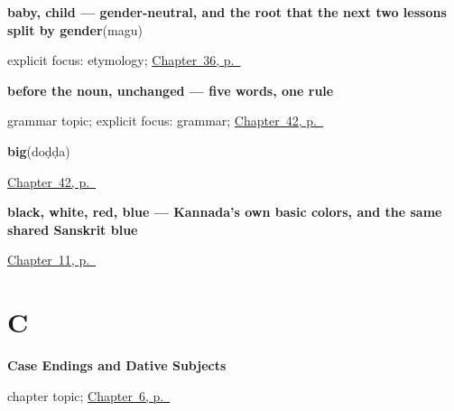 \noindent\begin{minipage}[t]{\linewidth}
\raggedright
\textbf{baby, child — gender-neutral, and the root that the next two lessons split by gender}\enspace\emph{}\enspace(magu)\par
\footnotesize explicit focus: etymology; \hyperref[ch:ka-child-son-daughter]{Chapter~36, p.~\pageref*{ch:ka-child-son-daughter}}
\end{minipage}\par\smallskip

\noindent\begin{minipage}[t]{\linewidth}
\raggedright
\textbf{before the noun, unchanged — five words, one rule}\par
\footnotesize grammar topic; explicit focus: grammar; \hyperref[ch:kn-describing-things]{Chapter~42, p.~\pageref*{ch:kn-describing-things}}
\end{minipage}\par\smallskip

\noindent\begin{minipage}[t]{\linewidth}
\raggedright
\textbf{big}\enspace\emph{}\enspace(doḍḍa)\par
\footnotesize \hyperref[ch:kn-describing-things]{Chapter~42, p.~\pageref*{ch:kn-describing-things}}
\end{minipage}\par\smallskip

\noindent\begin{minipage}[t]{\linewidth}
\raggedright
\textbf{black, white, red, blue — Kannada's own basic colors, and the same shared Sanskrit blue}\enspace\emph{   }\par
\footnotesize \hyperref[ch:ka-core-colours]{Chapter~11, p.~\pageref*{ch:ka-core-colours}}
\end{minipage}\par\smallskip

\section*{C}

\noindent\begin{minipage}[t]{\linewidth}
\raggedright
\textbf{Case Endings and Dative Subjects}\par
\footnotesize chapter topic; \hyperref[ch:ka-dative-case]{Chapter~6, p.~\pageref*{ch:ka-dative-case}}
\end{minipage}\par\smallskip

